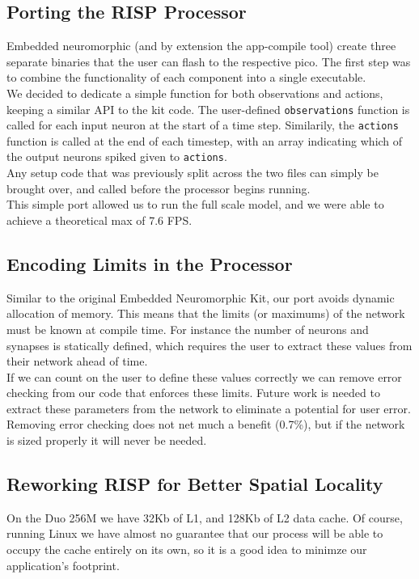 \documentclass[conference]{IEEEtran}{article}
\begin{document}
\subsection{Porting the RISP Processor}
\label{sec:org1800284}
Embedded neuromorphic (and by extension the app-compile tool) create three separate binaries that the user can flash to the respective pico. The first step was to combine the functionality of each component into a single executable.\\

We decided to dedicate a simple function for both observations and actions, keeping a similar API to the kit code. The user-defined \texttt{observations} function is called for each input neuron at the start of a time step. Similarily, the \texttt{actions} function is called at the end of each timestep, with an array indicating which of the output neurons spiked given to \texttt{actions}.\\

Any setup code that was previously split across the two files can simply be brought over, and called before the processor begins running.\\

This simple port allowed us to run the full scale model, and we were able to achieve a theoretical max of 7.6 FPS.\\
\subsection{Encoding Limits in the Processor}
\label{sec:org5af08ad}
Similar to the original Embedded Neuromorphic Kit, our port avoids dynamic allocation of memory. This means that the limits (or maximums) of the network must be known at compile time. For instance the number of neurons and synapses is statically defined, which requires the user to extract these values from their network ahead of time.\\

If we can count on the user to define these values correctly we can remove error checking from our code that enforces these limits. Future work is needed to extract these parameters from the network to eliminate a potential for user error.\\

Removing error checking does not net much a benefit (0.7\%), but if the network is sized properly it will never be needed.\\
\subsection{Reworking RISP for Better Spatial Locality}
\label{sec:org4e555f5}
On the Duo 256M we have 32Kb of L1, and 128Kb of L2 data cache. Of course, running Linux we have almost no guarantee that our process will be able to occupy the cache entirely on its own, so it is a good idea to minimze our application's footprint.\\
\end{document}
